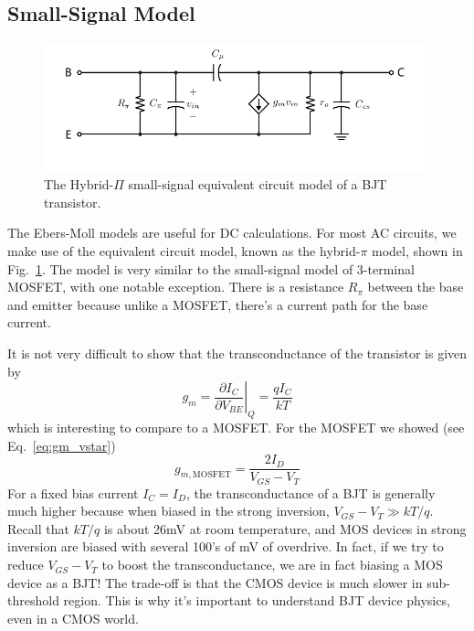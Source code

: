 \subsection{Small-Signal Model}
\begin{figure}[tb]
\begin{center}
\includegraphics[scale=1]{bjt_hybridpi}
\end{center}
\caption{The Hybrid-$\Pi$ small-signal equivalent circuit model of a BJT transistor.} \label{fig:bjt_hybridpi}
\end{figure}

The Ebers-Moll models are useful for DC calculations.  For most AC circuits, we make use of the equivalent circuit model, known as the hybrid-$\pi$ model, shown in Fig.~\ref{fig:bjt_hybridpi}.  The model is very similar to the small-signal model of 3-terminal MOSFET, with one notable exception.  There is a resistance $R_\pi$ between the base and emitter because unlike a MOSFET, there's a current path for the base current.  

It is not very difficult to show that the transconductance of the transistor is given by
\begin{equation}
	g_m = \left. \frac{\partial I_C}{\partial V_{BE}} \right|_Q =  \frac{qI_C}{kT}
\end{equation}
which is interesting to compare to a MOSFET.  For the MOSFET we showed (see Eq.~\ref{eq:gm_vstar})
\begin{equation}
	g_{m,\text{MOSFET}} = \frac{2 I_D}{V_{GS} - V_T}
\end{equation}
For a fixed bias current $I_C = I_D$, the transconductance of a BJT is generally much higher because when biased in the strong inversion, $V_{GS} - V_T \gg kT/q$.  Recall that $kT/q$ is about 26mV at room temperature, and MOS devices in strong inversion are biased with several 100's of mV of overdrive.  In fact, if we try to reduce $V_{GS}-V_T$ to boost the transconductance, we are in fact biasing a MOS device as a BJT!  The trade-off is that the CMOS device is much slower in sub-threshold region.  This is why it's important to understand BJT device physics, even in a CMOS world.
 
